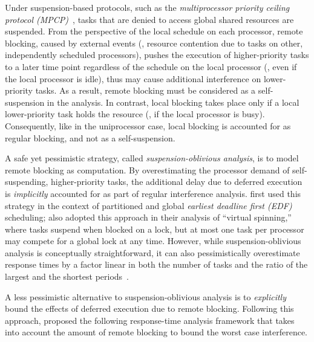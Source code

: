 Under suspension-based protocols, such as the \emph{multiprocessor priority ceiling protocol (MPCP)}~\cite{rajkumar-1990}, tasks that are denied to access global shared resources are suspended. From the perspective of the local schedule on each processor, remote blocking, caused by external events (\ie, resource contention due to tasks on other, independently scheduled processors), pushes the execution of higher-priority tasks to a later time point regardless of the schedule on the local processor (\ie, even if the local processor is idle), thus may cause additional interference on lower-priority tasks. As a result, remote blocking must be considered as a self-suspension in the analysis. In contrast, local blocking takes place only if a local lower-priority task holds the resource (\ie, if the local processor is busy). Consequently, like in the uniprocessor case, local blocking is accounted for as regular blocking, and not as a self-suspension.

A safe yet pessimistic strategy, called \emph{suspension-oblivious analysis}, is to model remote blocking as computation. By overestimating the processor demand of self-suspending, higher-priority tasks, the additional delay due to deferred execution is \emph{implicitly} accounted for as part of regular interference analysis. \citet{block-2007} first used this strategy in the context of partitioned and global \emph{earliest deadline first (EDF)} scheduling;  \citet{lakshmanan-2009} also adopted this approach in their analysis of ``virtual spinning,'' where tasks suspend when blocked on a lock, but at most one task per processor may compete for a global lock at any time. However, while suspension-oblivious analysis is conceptually straightforward, it can also pessimistically overestimate response times by a factor linear in both the number of tasks and the ratio of the largest and the shortest periods~\cite{wieder-2013}.


A less pessimistic alternative to suspension-oblivious analysis is to \emph{explicitly} bound the effects of deferred execution due to remote blocking. Following this approach, \citet{lakshmanan-2009} proposed the following response-time analysis framework that takes into account the amount of remote blocking to bound the worst case interference.

